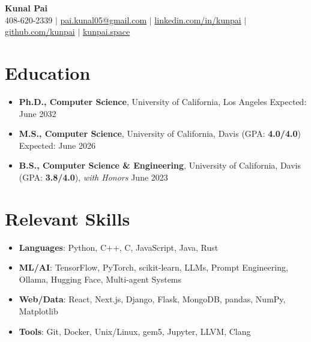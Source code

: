 \documentclass[letterpaper,10pt]{article}
\begin{document}
{\Large
\begin{center}
  \textbf{\Huge Kunal Pai} \\
  \small 408-620-2339 $|$ \href{mailto:pai.kunal05@gmail.com}{pai.kunal05@gmail.com} $|$ 
  \href{https://linkedin.com/in/kunpai}{linkedin.com/in/kunpai} $|$
  \href{https://github.com/kunpai}{github.com/kunpai} $|$
  \href{https://www.kunpai.space}{kunpai.space}
\end{center}
}

\section{Education}
{\normalsize
\begin{itemize}[leftmargin=0.15in, label={}, itemsep=0pt]
  \item \textbf{Ph.D., Computer Science}, University of California, Los Angeles \hfill Expected: June 2032
  \item \textbf{M.S., Computer Science}, University of California, Davis (GPA: \textbf{4.0/4.0}) \hfill Expected: June 2026
  \item \textbf{B.S., Computer Science \& Engineering}, University of California, Davis (GPA: \textbf{3.8/4.0}), \textit{with Honors} \hfill June 2023
\end{itemize}
}

\section{Relevant Skills}
{\normalsize
\begin{itemize}[leftmargin=0.15in, label={}, itemsep=0pt]
  \item \textbf{Languages}: Python, C++, C, JavaScript, Java, Rust
  \item \textbf{ML/AI}: TensorFlow, PyTorch, scikit-learn, LLMs, Prompt Engineering, Ollama, Hugging Face, Multi-agent Systems
  \item \textbf{Web/Data}: React, Next.js, Django, Flask, MongoDB, pandas, NumPy, Matplotlib
  \item \textbf{Tools}: Git, Docker, Unix/Linux, gem5, Jupyter, LLVM, Clang
\end{itemize}
}
\end{document}
